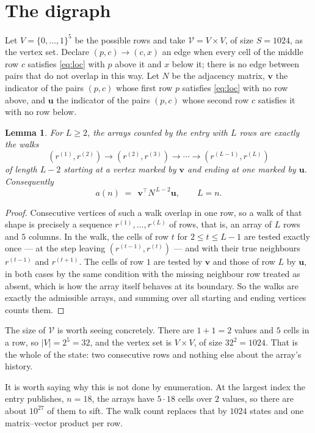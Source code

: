 \documentclass[11pt,a4paper]{article}
\theoremstyle{plain}
\newtheorem{lemma}[theorem]{Lemma}
\theoremstyle{definition}
\begin{document}
\section{The digraph}

Let $V=\{0,\dots,1\}^{5}$ be the possible rows and take
$\mathcal V=V\times V$, of size $S=1024$, as the vertex set. Declare $(p,c)\to(c,x)$ an edge
when every cell of the middle row $c$ satisfies \eqref{eq:loc} with $p$ above it and $x$
below it; there is no edge between pairs that do not overlap in this way. Let $N$ be the
adjacency matrix, $\mathbf{v}$ the indicator of the pairs $(p,c)$ whose first row $p$
satisfies \eqref{eq:loc} with no row above, and $\mathbf{u}$ the indicator of
the pairs $(p,c)$ whose second row $c$ satisfies it with no row below.

\begin{lemma}\label{lem:walk}
For $L\ge2$, the arrays counted by the entry with $L$ rows are exactly the walks
\[
(r^{(1)},r^{(2)})\to(r^{(2)},r^{(3)})\to\cdots\to(r^{(L-1)},r^{(L)})
\]
of length $L-2$ starting at a vertex marked by $\mathbf{v}$ and ending at one marked by
$\mathbf{u}$. Consequently
\[
a(n)\;=\;\,\mathbf{v}^{\!\top}N^{\,L-2}\mathbf{u},\qquad L=n .
\]
\end{lemma}

\begin{proof}
Consecutive vertices of such a walk overlap in one row, so a walk of that shape is
precisely a sequence $r^{(1)},\dots,r^{(L)}$ of rows, that is, an array of $L$ rows
and $5$ columns. In the walk, the cells of row $t$ for $2\le t\le L-1$ are tested
exactly once --- at the step leaving $(r^{(t-1)},r^{(t)})$ --- and with their true
neighbours $r^{(t-1)}$ and $r^{(t+1)}$. The cells of row $1$ are tested by
$\mathbf{v}$ and those of row $L$ by $\mathbf{u}$, in both cases by the same condition
with the missing neighbour row treated as absent, which is how the array itself behaves at
its boundary. So the walks are exactly the admissible arrays, and summing over all starting
and ending vertices counts them.
\end{proof}


The size of $\mathcal V$ is worth seeing concretely. There are $1+1=2$ values
and $5$ cells in a row, so $|V|=2^{5}=32$, and the vertex set is
$V\times V$, of size $32^2=1024$. That is the whole of the state: two consecutive
rows and nothing else about the array's history.

It is worth saying why this is not done by enumeration. At the largest index the entry
publishes, $n=18$, the arrays have $5\cdot18$ cells over
$2$ values, so there are about $10^{27}$ of them to sift. The
walk count replaces that by $1024$ states and one matrix--vector product per row.
\end{document}
